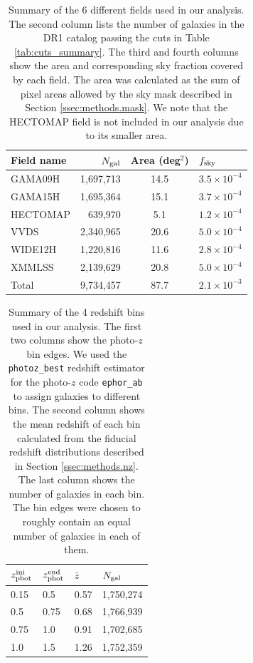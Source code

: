 \documentclass[a4paper,11pt]{article}
\begin{document}
  \begin{table}
  \centering
  \begin{tabular}{|l|r|c|l|}
   \hline
   {\bf Field name} & $N_{\rm gal}$ & {\bf Area} (deg$^2$) & $f_{\rm sky}$ \\
   \hline
   GAMA09H  & 1,697,713 & 14.5 & $3.5\times10^{-4}$ \\
   GAMA15H  & 1,695,364 & 15.1 & $3.7\times10^{-4}$ \\
   HECTOMAP &   639,970 &  5.1 & $1.2\times10^{-4}$ \\
   VVDS     & 2,340,965 & 20.6 & $5.0\times10^{-4}$ \\
   WIDE12H  & 1,220,816 & 11.6 & $2.8\times10^{-4}$ \\
   XMMLSS   & 2,139,629 & 20.8 & $5.0\times10^{-4}$ \\
   \hline
   Total    & 9,734,457 & 87.7 & $2.1\times10^{-3}$ \\
   \hline
  \end{tabular}
  \caption{Summary of the 6 different fields used in our analysis. The second column lists the number of galaxies in the DR1 catalog passing the cuts in Table \ref{tab:cuts_summary}. The third and fourth columns show the area and corresponding sky fraction covered by each field. The area was calculated as the sum of pixel areas allowed by the sky mask described in Section \ref{ssec:methods.mask}. We note that the HECTOMAP field is not included in our analysis due to its smaller area.} \label{tab:field_summary}
  \end{table}  

  \begin{table}
  \centering
  \begin{tabular}{|l|l|l|l|}
    \hline
    $z_{\rm phot}^{\rm ini}$ & $z_{\rm phot}^{\rm end}$ & $\bar{z}$ & $N_{\rm gal}$ \\
    \hline
    0.15 & 0.5  & 0.57 & 1,750,274 \\
    0.5  & 0.75 & 0.68 & 1,766,939 \\
    0.75 & 1.0  & 0.91 & 1,702,685 \\
    1.0  & 1.5  & 1.26 & 1,752,359 \\
    \hline
  \end{tabular}
  \caption{Summary of the 4 redshift bins used in our analysis. The first two columns show the photo-$z$ bin edges. We used the {\tt photoz\_best} redshift estimator for the photo-$z$ code {\tt ephor\_ab} to assign galaxies to different bins. The second column shows the mean redshift of each bin calculated from the fiducial redshift distributions described in Section \ref{ssec:methods.nz}. The last column shows the number of galaxies in each bin. The bin edges were chosen to roughly contain an equal number of galaxies in each of them.} \label{tab:bins_summary}
  \end{table}
  
\end{document}
